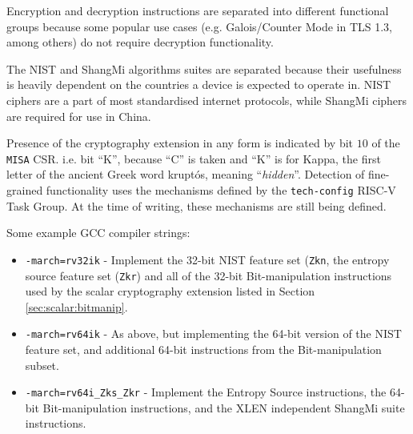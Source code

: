 Encryption and decryption instructions are separated into different functional
groups because some popular use cases (e.g. Galois/Counter Mode in TLS 1.3, among others)
do not require decryption functionality.

The NIST and ShangMi algorithms suites are separated because their usefulness is
heavily dependent on the countries a device is expected to operate in.
NIST ciphers are a part of most standardised internet protocols, while ShangMi ciphers are
required for use in China.

Presence of the cryptography extension in any form is indicated
by bit $10$ of the {\tt MISA} CSR.
i.e. bit ``K'', because ``C'' is taken and ``K'' is for Kappa, the
first letter of the ancient Greek word kruptós,
meaning ``{\em hidden}''.
Detection of fine-grained functionality uses the mechanisms defined
by the {\tt tech-config} RISC-V Task Group.
At the time of writing, these mechanisms are still being defined.

Some example GCC compiler strings:
\begin{itemize}
\item {\tt -march=rv32ik} -
    Implement the 32-bit NIST feature set ({\tt Zkn},
    the entropy source feature set ({\tt Zkr}) and
    all of the 32-bit Bit-manipulation instructions used by the
    scalar cryptography extension listed in Section \ref{sec:scalar:bitmanip}.
\item {\tt -march=rv64ik} -
    As above, but implementing the 64-bit version of the NIST feature set,
    and additional 64-bit instructions from the Bit-manipulation subset.
\item {\tt -march=rv64i\_Zks\_Zkr} -
    Implement the Entropy Source instructions,
    the 64-bit Bit-manipulation instructions,
    and the XLEN independent ShangMi suite instructions.
\end{itemize}

